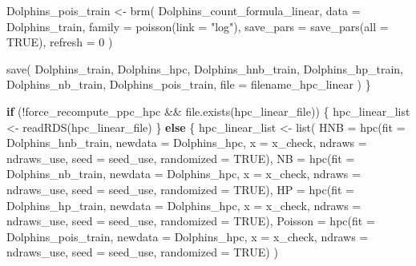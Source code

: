\documentclass[
  english,
  letterpaper,
  DIV=11,
  numbers=noendperiod]{scrartcl}
\newenvironment{Shaded}{\begin{snugshade}}{\end{snugshade}}
\newcommand{\AttributeTok}[1]{\textcolor[rgb]{0.40,0.45,0.13}{#1}}
\newcommand{\ConstantTok}[1]{\textcolor[rgb]{0.56,0.35,0.01}{#1}}
\newcommand{\ControlFlowTok}[1]{\textcolor[rgb]{0.00,0.23,0.31}{\textbf{#1}}}
\newcommand{\DecValTok}[1]{\textcolor[rgb]{0.68,0.00,0.00}{#1}}
\newcommand{\FunctionTok}[1]{\textcolor[rgb]{0.28,0.35,0.67}{#1}}
\newcommand{\NormalTok}[1]{\textcolor[rgb]{0.00,0.23,0.31}{#1}}
\newcommand{\OtherTok}[1]{\textcolor[rgb]{0.00,0.23,0.31}{#1}}
\newcommand{\SpecialCharTok}[1]{\textcolor[rgb]{0.37,0.37,0.37}{#1}}
\newcommand{\StringTok}[1]{\textcolor[rgb]{0.13,0.47,0.30}{#1}}
\begin{document}
\begin{Shaded}
\begin{Highlighting}[]
\NormalTok{  Dolphins\_pois\_train }\OtherTok{\textless{}{-}} \FunctionTok{brm}\NormalTok{(}
\NormalTok{    Dolphins\_count\_formula\_linear,}
    \AttributeTok{data   =}\NormalTok{ Dolphins\_train,}
    \AttributeTok{family =} \FunctionTok{poisson}\NormalTok{(}\AttributeTok{link =} \StringTok{"log"}\NormalTok{),}
    \AttributeTok{save\_pars =} \FunctionTok{save\_pars}\NormalTok{(}\AttributeTok{all =} \ConstantTok{TRUE}\NormalTok{),}
    \AttributeTok{refresh   =} \DecValTok{0}
\NormalTok{  )}

  \FunctionTok{save}\NormalTok{(}
\NormalTok{    Dolphins\_train, Dolphins\_hpc,}
\NormalTok{    Dolphins\_hnb\_train, Dolphins\_hp\_train, Dolphins\_nb\_train, Dolphins\_pois\_train,}
    \AttributeTok{file =}\NormalTok{ filename\_hpc\_linear}
\NormalTok{  )}
\NormalTok{\}}

\ControlFlowTok{if}\NormalTok{ (}\SpecialCharTok{!}\NormalTok{force\_recompute\_ppc\_hpc }\SpecialCharTok{\&\&} \FunctionTok{file.exists}\NormalTok{(hpc\_linear\_file)) \{}
\NormalTok{  hpc\_linear\_list }\OtherTok{\textless{}{-}} \FunctionTok{readRDS}\NormalTok{(hpc\_linear\_file)}
\NormalTok{\} }\ControlFlowTok{else}\NormalTok{ \{}
\NormalTok{  hpc\_linear\_list }\OtherTok{\textless{}{-}} \FunctionTok{list}\NormalTok{(}
    \AttributeTok{HNB =} \FunctionTok{hpc}\NormalTok{(}\AttributeTok{fit =}\NormalTok{ Dolphins\_hnb\_train, }\AttributeTok{newdata =}\NormalTok{ Dolphins\_hpc, }\AttributeTok{x =}\NormalTok{ x\_check,}
              \AttributeTok{ndraws =}\NormalTok{ ndraws\_use, }\AttributeTok{seed =}\NormalTok{ seed\_use, }\AttributeTok{randomized =} \ConstantTok{TRUE}\NormalTok{),}
    \AttributeTok{NB =} \FunctionTok{hpc}\NormalTok{(}\AttributeTok{fit =}\NormalTok{ Dolphins\_nb\_train, }\AttributeTok{newdata =}\NormalTok{ Dolphins\_hpc, }\AttributeTok{x =}\NormalTok{ x\_check,}
             \AttributeTok{ndraws =}\NormalTok{ ndraws\_use, }\AttributeTok{seed =}\NormalTok{ seed\_use, }\AttributeTok{randomized =} \ConstantTok{TRUE}\NormalTok{),}
    \AttributeTok{HP =} \FunctionTok{hpc}\NormalTok{(}\AttributeTok{fit =}\NormalTok{ Dolphins\_hp\_train, }\AttributeTok{newdata =}\NormalTok{ Dolphins\_hpc, }\AttributeTok{x =}\NormalTok{ x\_check,}
             \AttributeTok{ndraws =}\NormalTok{ ndraws\_use, }\AttributeTok{seed =}\NormalTok{ seed\_use, }\AttributeTok{randomized =} \ConstantTok{TRUE}\NormalTok{),}
    \AttributeTok{Poisson =} \FunctionTok{hpc}\NormalTok{(}\AttributeTok{fit =}\NormalTok{ Dolphins\_pois\_train, }\AttributeTok{newdata =}\NormalTok{ Dolphins\_hpc, }\AttributeTok{x =}\NormalTok{ x\_check,}
                  \AttributeTok{ndraws =}\NormalTok{ ndraws\_use, }\AttributeTok{seed =}\NormalTok{ seed\_use, }\AttributeTok{randomized =} \ConstantTok{TRUE}\NormalTok{)}
\NormalTok{  )}


\end{Highlighting}
\end{Shaded}
\end{document}
